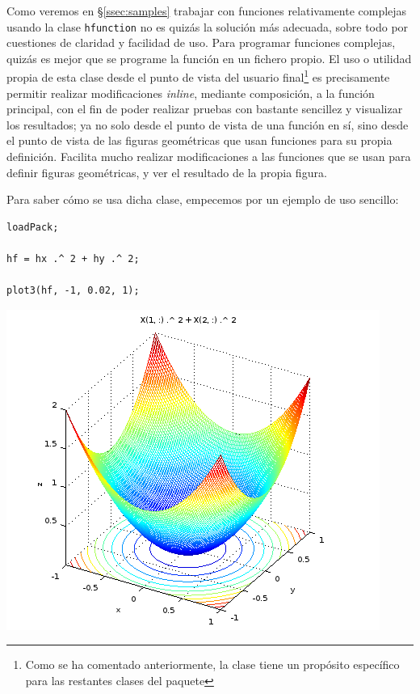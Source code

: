 \documentclass{article}
\newcommand{\refpar}[1]{\S\ref{#1}}
\begin{document}
Como veremos en \refpar{ssec:samples} trabajar con funciones
relativamente complejas usando la clase \texttt{hfunction} no es
quizás la solución más adecuada, sobre todo por cuestiones de claridad
y facilidad de uso. Para programar funciones complejas, quizás es
mejor que se programe la función en un fichero propio. El uso o
utilidad propia de esta clase desde el punto de vista del usuario
final\footnote{Como se ha comentado anteriormente, la clase tiene un
  propósito específico para las restantes clases del paquete} es
precisamente permitir realizar modificaciones \textit{inline},
mediante composición, a la función principal, con el fin de poder
realizar pruebas con bastante sencillez y visualizar los resultados;
ya no solo desde el punto de vista de una función en sí, sino desde el
punto de vista de las figuras geométricas que usan funciones para su
propia definición. Facilita mucho realizar modificaciones a las
funciones que se usan para definir figuras geométricas, y ver el
resultado de la propia figura.

Para saber cómo se usa dicha clase, empecemos por un ejemplo de uso
sencillo:

\begin{minipage}{0.4\textwidth}
\begin{verbatim}
loadPack;

hf = hx .^ 2 + hy .^ 2;

plot3(hf, -1, 0.02, 1);
\end{verbatim}
\end{minipage}
\begin{minipage}{0.6\textwidth}
\includegraphics[scale=0.6]{figure1.png}
\end{minipage}
\end{document}
